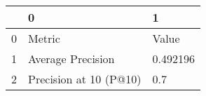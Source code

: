 \begin{tabular}{lll}
\toprule
{} &                       0 &         1 \\
\midrule
0 &                  Metric &     Value \\
1 &       Average Precision &  0.492196 \\
2 &  Precision at 10 (P@10) &       0.7 \\
\bottomrule
\end{tabular}
